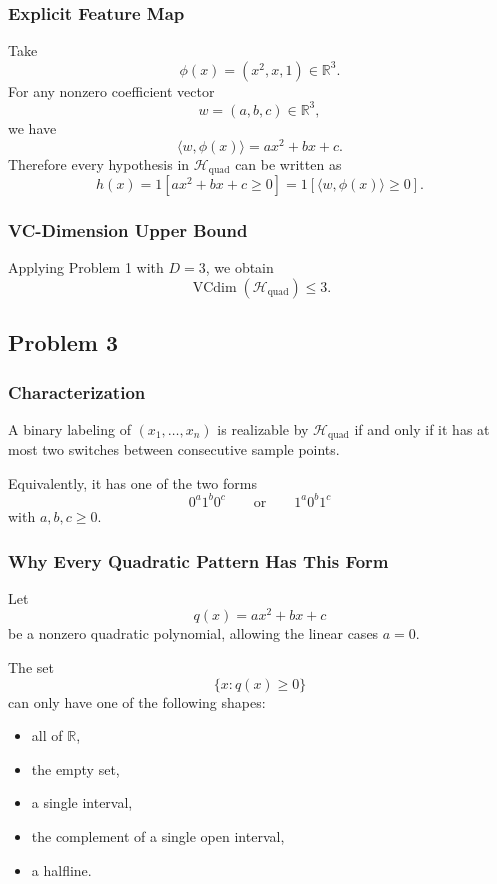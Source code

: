 \documentclass{article}
\begin{document}
\subsubsection{Explicit Feature Map}

Take
$$
\phi(x) = (x^2,x,1) \in \mathbb{R}^3.
$$
For any nonzero coefficient vector
$$
w = (a,b,c) \in \mathbb{R}^3,
$$
we have
$$
\langle w,\phi(x)\rangle = ax^2 + bx + c.
$$
Therefore every hypothesis in $\mathcal{H}_{\mathrm{quad}}$ can be written as
$$
h(x)
=
1[ax^2 + bx + c \ge 0]
=
1[\langle w,\phi(x)\rangle \ge 0].
$$

\subsubsection{VC-Dimension Upper Bound}

Applying Problem 1 with $D=3$, we obtain
$$
\operatorname{VCdim}(\mathcal{H}_{\mathrm{quad}}) \le 3.
$$

\subsection{Problem 3}

\subsubsection{Characterization}

A binary labeling of $(x_1,\dots,x_n)$ is realizable by $\mathcal{H}_{\mathrm{quad}}$ if and only if it has at most two switches between consecutive sample points.

Equivalently, it has one of the two forms
$$
0^a1^b0^c
\qquad \text{or} \qquad
1^a0^b1^c
$$
with $a,b,c \ge 0$.

\subsubsection{Why Every Quadratic Pattern Has This Form}

Let
$$
q(x) = ax^2 + bx + c
$$
be a nonzero quadratic polynomial, allowing the linear cases $a=0$.

The set
$$
\{x : q(x) \ge 0\}
$$
can only have one of the following shapes:
\begin{itemize}
\item all of $\mathbb{R}$,
\item the empty set,
\item a single interval,
\item the complement of a single open interval,
\item a halfline.
\end{itemize}
\end{document}
